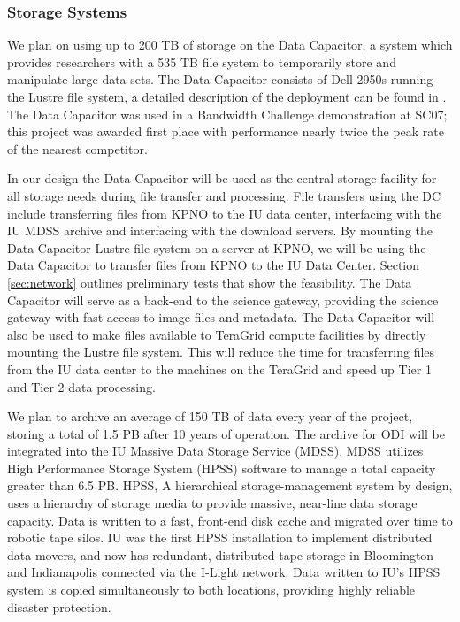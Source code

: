\documentclass[10pt,conference]{IEEEtran}
\begin{document}
\subsubsection{Storage Systems}

We plan on using up to 200 TB of storage on the Data Capacitor, a system which provides researchers with a 535 TB file system to temporarily store and manipulate large data sets. The Data Capacitor consists of Dell 2950s running the Lustre file system, a detailed description of the deployment can be found in \cite{simms2007}. The Data Capacitor was used in a Bandwidth Challenge demonstration at SC07; this project was awarded first place with performance nearly twice the peak rate of the nearest competitor.

In our design the Data Capacitor will be used as the central storage facility for all storage needs during file transfer and processing. File transfers using the DC include transferring files from KPNO to the IU data center, interfacing with the IU MDSS archive and interfacing with the download servers. By mounting the Data Capacitor Lustre file system on a server at KPNO, we will be using the Data Capacitor to transfer files from KPNO to the IU Data Center. Section \ref{sec:network} outlines preliminary tests that show the feasibility. The Data Capacitor will serve as a back-end to the science gateway, providing the science gateway with fast access to image files and metadata. The Data Capacitor will also be used to make files available to TeraGrid compute facilities by directly mounting the Lustre file system. This will reduce the time for transferring files from the IU data center to the machines on the TeraGrid and speed up Tier 1 and Tier 2 data processing.

We plan to archive an average of 150 TB of data every year of the project, storing a total of 1.5 PB after 10 years of operation. The archive for ODI will be integrated into the IU Massive Data Storage Service (MDSS). MDSS utilizes High Performance Storage System (HPSS) software to manage a total capacity greater than 6.5 PB. HPSS, A hierarchical storage-management system by design, uses a hierarchy of storage media to provide massive, near-line data storage capacity. Data is written to a fast, front-end disk cache and migrated over time to robotic tape silos. IU was the first HPSS installation to implement distributed data movers, and now has redundant, distributed tape storage in Bloomington and Indianapolis connected via the I-Light network. Data written to IU's HPSS system is copied simultaneously to both locations, providing highly reliable disaster protection. 
\end{document}
